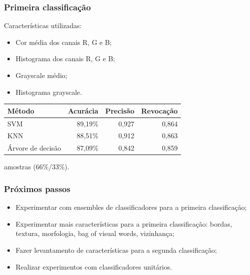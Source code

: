\documentclass[t]{beamer}
\begin{document}
\begin{frame}
	\frametitle{Primeira classificação}

	Características utilizadas:
	\begin{itemize}
		\item Cor média dos canais R, G e B;
		\item Histograma dos canais R, G e B;
		\item Grayscale médio;
		\item Histograma grayscale.
	\end{itemize}





	\small{
	\begin{table}[h]
	\centering
	\begin{tabulary}{\linewidth}{|L|R|R|R|}
		\hline
		\textbf{Método} & \textbf{Acurácia} & \textbf{Precisão} & \textbf{Revocação} \\ \hline
		SVM               & 89,19\% & 0,927 & 0,864 \\ \hline
		KNN               & 88,51\% & 0,912 & 0,863 \\ \hline
		Árvore de decisão & 87,09\% & 0,842 & 0,859 \\ \hline
	\end{tabulary}
	\end{table}
	}
	 amostras (66\%/33\%).


\end{frame}

\begin{frame}
	\frametitle{Próximos passos}

	\begin{itemize}
		\item Experimentar com ensembles de classificadores para a primeira classificação;
		\item Experimentar mais características para a primeira classificação: bordas, textura, morfologia, bag of visual words, vizinhança;
		\item Fazer levantamento de características para a segunda classificação;
		\item Realizar experimentos com classificadores unitários.
	\end{itemize}

\end{frame}
\end{document}
